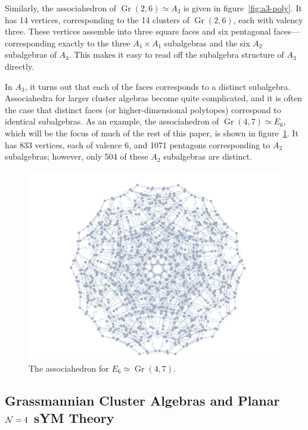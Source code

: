 \documentclass[11pt]{article}
\DeclareMathOperator{\Gr}{Gr}
\begin{document}
Similarly, the associahedron of $\Gr(2,6) \simeq A_3$ is given in figure~\ref{fig:a3-poly}. It has 14 vertices, corresponding to the 14 clusters of $\Gr(2,6)$, each with valency three. These vertices assemble into three square faces and six pentagonal faces---corresponding exactly to  the three $A_1 \times A_1$ subalgebras and the six $A_2$ subalgebras of $A_3$. This makes it easy to read off the subalgebra structure of $A_3$ directly. 

In $A_3$, it turns out that each of the faces corresponds to a distinct subalgebra. Associahedra for larger cluster algebras become quite complicated, and it is often the case that distinct faces (or higher-dimensional polytopes) correspond to identical subalgebras. As an example, the associahedron of $\Gr(4,7)\simeq E_6$, which will be the focus of much of the rest of this paper, is shown in figure~\ref{fig:e6-poly}. It has 833 vertices, each of valence 6, and 1071 pentagons corresponding to $A_2$ subalgebras; however, only 504 of these $A_2$ subalgebras are distinct.

\begin{figure}[t]  \centering
  \includegraphics[scale=0.25]{e6-associahedron}
  \caption{The associahedron for $E_6\simeq\Gr(4,7)$.}
  \label{fig:e6-poly}
\end{figure}

\subsection{Grassmannian Cluster Algebras and Planar ${\cal N} = 4$ sYM Theory}
\end{document}
